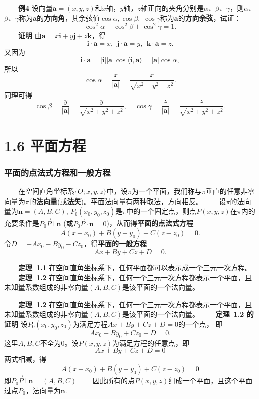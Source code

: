 \documentclass[compress,mathserif,cjk]{beamer}
\theoremstyle{remark}
\numberwithin{equation}{section}
\newcommand{\hei}{\bf}      %
\begin{document}
\begin{CJK}{UTF8}{gbsn}
\begin{frame}

 \ \ \ \ {\hei 例4} 设向量$\bm a=(x,y,z)$和$x$轴，$y$轴，$z$轴正向的夹角分别是$\alpha$、$\beta$、$\gamma$，则$\alpha$、$\beta$、$\gamma$称为$\bm a$的{\hei 方向角}，其余弦值$\cos\alpha,\cos\beta,$ $\cos\gamma$称为$\bm a$的{\hei 方向余弦}，试证：
 $$\cos^2\alpha+\cos^2\beta+\cos^2\gamma=1.$$
 \pause
 \ \ \ \ {\hei 证明} 由$\bm a=x\bm i+y\bm j+z\bm k$，得
 $$\bm i\cdot\bm a=x,~~\bm j\cdot\bm a=y,~~\bm k\cdot\bm a=z.$$
 又因为
 $$\bm i\cdot\bm a=|\bm i||\bm a|\cos\langle\bm i,\bm a\rangle=|\bm a|\cos\alpha,$$
 所以
 $$\cos\alpha=\frac{x}{|\bm a|}=\frac{x}{\sqrt{x^2+y^2+z^2}}.$$
 同理可得
 $$\cos\beta=\frac{y}{|\bm a|}=\frac{y}{\sqrt{x^2+y^2+z^2}},~~~~~\cos\gamma=\frac{z}{|\bm a|}=\frac{z}{\sqrt{x^2+y^2+z^2}}.$$

\end{frame}
\section[1.6]{1.6 平面方程}
\begin{frame} \frametitle{平面的点法式方程和一般方程}
 \ \ \ \ 在空间直角坐标系$\{O;x,y,z\}$中，设$\pi$为一个平面，我们称与$\pi$垂直的任意非零向量为$\pi$的{\hei 法向量}(或{\hei 法矢})。平面法向量有两种取法，方向相反。
 \pause\vskip 10pt
 \ \ \ \ 设$\pi$的法向量为$\bm n=(A,B,C)$, $P_0(x_0,y_0,z_0)$是$\pi$中的一个固定点，则点$P(x,y,z)$在$\pi$内的充要条件是$\overset{\longrightarrow}{P_0P}\bot\bm n$ (或$\overset{\longrightarrow}{P_0P}\cdot\bm n=0$)，\pause 从而得{\hei 平面的点法式方程}
  $$A(x-x_0)+B(y-y_0)+C(z-z_0)=0.$$
 \pause 令$D=-Ax_0-By_0-Cz_0$，得{\hei 平面的一般方程}
 $$Ax+By+Cz+D=0.$$


\end{frame}


\begin{frame}
 \ \ \ \ {\hei 定理~1.1} 在空间直角坐标系下，任何平面都可以表示成一个三元一次方程。
 \pause\vskip 10pt
 \ \ \ \ {\hei 定理~1.2} 在空间直角坐标系下，任何一个三元一次方程都表示一个平面，且未知量系数组成的非零向量$(A,B,C)$是该平面的一个法向量。

\end{frame}

\begin{frame}
\ \ \ \ {\hei 定理~1.2} 在空间直角坐标系下，任何一个三元一次方程都表示一个平面，且未知量系数组成的非零向量$(A,B,C)$是该平面的一个法向量。
\pause\vskip 5pt
 \ \ \ \ {\hei 定理~1.2 的证明} 设$P_0(x_0,y_0,z_0)$为满足方程$Ax+By+Cz+D=0$的一个点，
 即
 $$Ax_0+By_0+Cz_0+D=0.$$
 这里$A,B,C$不全为0。设$P(x,y,z)$为满足方程的任意点，即
 $$Ax+By+Cz+D=0$$
 两式相减，得
 $$A(x-x_0)+B(y-y_0)+C(z-z_0)=0$$
 即$\overset{\longrightarrow}{P_0P}\bot\bm n=(A,B,C)$
 \vskip 2pt
 \ \ \ \ 因此所有的点$P(x,y,z)$组成一个平面，且这个平面过点$P_0$，法向量为$\bm n$.
\end{frame}


\end{CJK}
\end{document}
